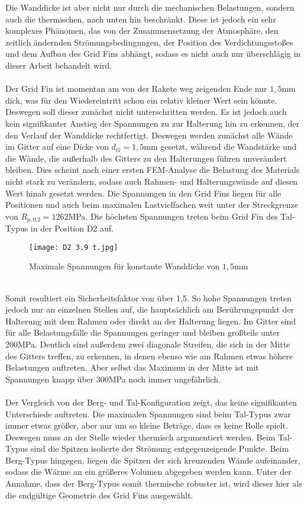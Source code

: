 Die Wanddicke ist aber nicht nur durch die mechanischen Belastungen, sondern auch die thermischen, nach unten hin beschränkt. Diese ist jedoch ein sehr komplexes Phänomen, das von der Zusammensetzung der Atmosphäre, den zeitlich ändernden Strömungsbedingungen, der Position des Verdichtungsstoßes und dem Aufbau des Grid Fins abhängt, sodass es nicht auch nur überschlägig in dieser Arbeit behandelt wird.
\\~\\
Der Grid Fin ist momentan am von der Rakete weg zeigenden Ende nur $1,5$mm dick, was für den Wiedereintritt schon ein relativ kleiner Wert sein könnte. Deswegen soll dieser zunächst nicht unterschritten werden. Es ist jedoch auch kein signifikanter Anstieg der Spannungen zu zur Halterung hin zu erkennen, der den Verlauf der Wanddicke rechtfertigt. Deswegen werden zunächst alle Wände im Gitter auf eine Dicke von $d_G = 1,5$mm gesetzt, während die Wandstärke und die Wände, die außerhalb des Gitters zu den Halterungen führen unverändert bleiben. Dies scheint nach einer ersten FEM-Analyse die Belastung des Materials nicht stark zu verändern, sodass auch Rahmen- und Halterungswände auf diesen Wert hinab gesetzt werden. Die Spannungen in den Grid Fins liegen für alle Positionen und auch beim maximalen Lastvielfachen weit unter der Streckgrenze von $R_{p, 0.2} = 1262$MPa. Die höchsten Spannungen treten beim Grid Fin des Tal-Typus in der Position D2 auf. 
\begin{figure}[h] 
	\centering
	\texttt{[image: D2 3.9 t.jpg]}
	\caption{Maximale Spannungen für konstante Wanddicke von $1,5$mm}
\end{figure}\\
Somit resultiert ein Sicherheitsfaktor von über 1,5. So hohe Spannungen treten jedoch nur an einzelnen Stellen auf, die hauptsächlich am Berührungspunkt der Halterung mit dem Rahmen oder direkt an der Halterung liegen. Im Gitter sind für alle Belastungsfälle die Spannungen geringer und bleiben großteils unter 200MPa. Deutlich sind außerdem zwei diagonale Streifen, die sich in der Mitte des Gitters treffen, zu erkennen, in denen ebenso wie am Rahmen etwas höhere Belastungen auftreten. Aber selbst das Maximum in der Mitte ist mit Spannungen knapp über 300MPa noch immer ungefährlich.
\\~\\
Der Vergleich von der Berg- und Tal-Konfiguration zeigt, das keine signifikanten Unterschiede auftreten. Die maximalen Spannungen sind beim Tal-Typus zwar immer etwas größer, aber nur um so kleine Beträge, dass es keine Rolle spielt. Deswegen muss an der Stelle wieder thermisch argumentiert werden. Beim Tal-Typus sind die Spitzen isolierte der Strömung entgegenzeigende Punkte. Beim Berg-Typus hingegen, liegen die Spitzen der sich kreuzenden Wände aufeinander, sodass die Wärme an ein größeres Volumen abgegeben werden kann. Unter der Annahme, dass der Berg-Typus somit thermische robuster ist, wird dieser hier als die endgültige Geometrie des Grid Fins ausgewählt.
